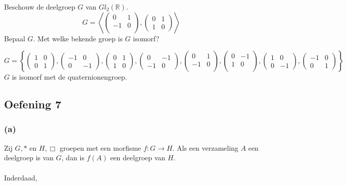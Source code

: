 \documentclass[main.tex]{subfiles}
\begin{document}
Beschouw de deelgroep $G$ van $Gl_{2}(\mathbb{R})$.
\[
G =
\left<
  \begin{pmatrix}
     0 & 1\\
    -1 & 0\\
  \end{pmatrix}
  ,
  \begin{pmatrix}
    0 & 1\\
    1 & 0
  \end{pmatrix}
\right>
\]
Bepaal $G$.
Met welke bekende groep is $G$ isomorf?

\[ 
G = 
\left\{ 
  \begin{pmatrix}
    1 & 0\\
    0 & 1
  \end{pmatrix}
,
  \begin{pmatrix}
    -1 & 0\\
    0 & -1
  \end{pmatrix}
,
  \begin{pmatrix}
    0 & 1\\
    1 & 0
  \end{pmatrix}
,
  \begin{pmatrix}
    0 & -1\\
    -1 & 0
  \end{pmatrix}
,
  \begin{pmatrix}
     0 & 1\\
    -1 & 0\\
  \end{pmatrix}
,
  \begin{pmatrix}
     0 & -1\\
    1 & 0\\
  \end{pmatrix}
,
  \begin{pmatrix}
    1 & 0\\
    0 & -1
  \end{pmatrix}
,
  \begin{pmatrix}
    -1 & 0\\
    0 & 1
  \end{pmatrix}
\right\}
\]
$G$ is isomorf met de quaternionengroep.


\subsection*{Oefening 7}
\label{oza:oz1-oef7}
\subsubsection*{(a)}
Zij $G,*$ en $H,\Box$ groepen met een morfisme $f: G \rightarrow H$.
Als een verzameling $A$ een deelgroep is van $G$, dan is $f(A)$ een deelgroep van $H$.\\\\
Inderdaad,
\end{document}
